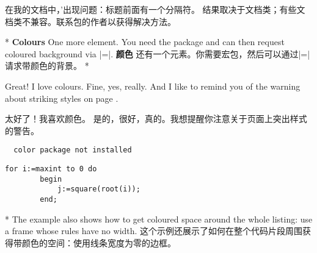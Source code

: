 \begin{paracol}{2}
\switchcolumn
\begin{advise}
    \item 在我的文档中，'出现问题：标题前面有一个分隔符。
    \advisespace
    结果取决于文档类；有些文档类不兼容。联系包的作者以获得解决方法。    
\end{advise}
\switchcolumn[0]*%
\textbf{Colours}
One more element. You need the  package and can then
request coloured background via
|=|.
\switchcolumn
\textbf{颜色}
还有一个元素。你需要宏包，然后可以通过|=|请求带颜色的背景。
\switchcolumn[0]*%
\begin{advise}
\item Great! I love colours.
     \advisespace
     Fine, yes, really. And I like to remind you of the warning about
     striking styles on page \pageref{wStrikingStyles}.
\end{advise}
\switchcolumn
\begin{advise}
    \item 太好了！我喜欢颜色。
\advisespace
是的，很好，真的。我想提醒你注意关于页面\pageref{wStrikingStyles}上突出样式的警告。
\end{advise}

\ifcolor
\begin{lstxsample}[backgroundcolor]
\end{lstxsample}
\else
\begin{verbatim}
  color package not installed\end{verbatim}
\fi
\begin{lstsample}{}{}
        \begin{lstlisting}[frame=single,
                            framerule=0pt]
        for i:=maxint to 0 do
        begin
            j:=square(root(i));
        end;
        \end{lstlisting}
\end{lstsample}
\switchcolumn[0]*%
The example also shows how to get coloured space around the whole listing:
use a frame whose rules have no width.
\switchcolumn
这个示例还展示了如何在整个代码片段周围获得带颜色的空间：使用线条宽度为零的边框。
\end{paracol}